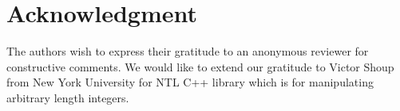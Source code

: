 \section*{Acknowledgment}
\label{sec:Acknowledgment}
The authors wish to express their gratitude to an anonymous reviewer for constructive comments. We would like to extend our gratitude to Victor Shoup from New York University for NTL C++ library which is for manipulating arbitrary length integers.

